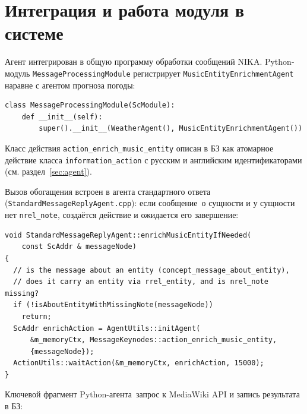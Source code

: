 \section{Интеграция и работа модуля в системе}
\label{sec:work}

Агент интегрирован в общую программу обработки сообщений NIKA. Python-модуль \texttt{MessageProcessingModule} регистрирует \texttt{MusicEntityEnrichmentAgent} наравне с агентом прогноза погоды:

\begin{lstlisting}[caption={Регистрация агента в Python-модуле},label={lst:module},basicstyle=\footnotesize\ttfamily]
class MessageProcessingModule(ScModule):
    def __init__(self):
        super().__init__(WeatherAgent(), MusicEntityEnrichmentAgent())
\end{lstlisting}

Класс действия \texttt{action\_enrich\_music\_entity} описан в БЗ как атомарное действие класса \texttt{information\_action} с русским и английским идентификаторами (см. раздел~\ref{sec:agent}).

Вызов обогащения встроен в агента стандартного ответа (\texttt{StandardMessageReplyAgent.cpp}): если сообщение~\mdash  о сущности и у сущности нет \texttt{nrel\_note}, создаётся действие и ожидается его завершение:

\begin{lstlisting}[caption={Фрагмент StandardMessageReplyAgent: инициирование обогащения},label={lst:cpp},basicstyle=\footnotesize\ttfamily]
void StandardMessageReplyAgent::enrichMusicEntityIfNeeded(
    const ScAddr & messageNode)
{
  // is the message about an entity (concept_message_about_entity),
  // does it carry an entity via rrel_entity, and is nrel_note missing?
  if (!isAboutEntityWithMissingNote(messageNode))
    return;
  ScAddr enrichAction = AgentUtils::initAgent(
      &m_memoryCtx, MessageKeynodes::action_enrich_music_entity,
      {messageNode});
  ActionUtils::waitAction(&m_memoryCtx, enrichAction, 15000);
}
\end{lstlisting}

Ключевой фрагмент Python-агента~\mdash  запрос к MediaWiki API и запись результата в БЗ:

